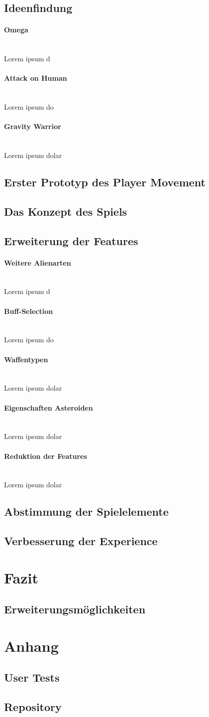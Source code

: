 \documentclass[11pt]{scrartcl}
\newcommand{\lbparagraph}[1]{\paragraph*{#1}\mbox{}\\}
\begin{document}
\subsection{Ideenfindung}
\lbparagraph{Omega}
Lorem ipsum d\cite{S2014}
\lbparagraph{Attack on Human}
Lorem ipsum do
\lbparagraph{Gravity Warrior}
Lorem ipsum dolar
\subsection{Erster Prototyp des Player Movement}
\subsection{Das Konzept des Spiels}
\subsection{Erweiterung der Features}
\lbparagraph{Weitere Alienarten}
Lorem ipsum d
\lbparagraph{Buff-Selection}
Lorem ipsum do
\lbparagraph{Waffentypen}
Lorem ipsum dolar
\lbparagraph{Eigenschaften Asteroiden}
Lorem ipsum dolar
\lbparagraph{Reduktion der Features}
Lorem ipsum dolar
\subsection{Abstimmung der Spielelemente}
\subsection{Verbesserung der Experience}
\section{Fazit}
\subsection{Erweiterungsmöglichkeiten}
\section{Anhang}
\subsection{User Tests}
\subsection{Repository}


\end{document}
